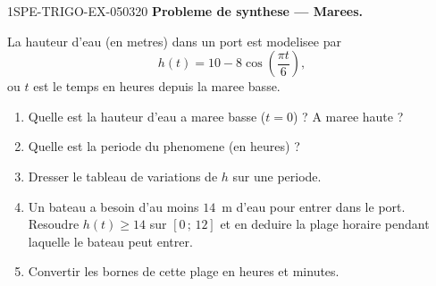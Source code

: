 \begin{exercice}{1SPE-TRIGO-EX-050}{3}{20}
\textbf{Probleme de synthese — Marees.}

La hauteur d'eau (en metres) dans un port est modelisee par
\[
  h(t) = 10 - 8\cos\!\left(\frac{\pi t}{6}\right),
\]
ou $t$ est le temps en heures depuis la maree basse.
\begin{enumerate}
  \item Quelle est la hauteur d'eau a maree basse ($t = 0$) ? A maree haute ?
  \item Quelle est la periode du phenomene (en heures) ?
  \item Dresser le tableau de variations de $h$ sur une periode.
  \item Un bateau a besoin d'au moins $14$~m d'eau pour entrer dans le port. Resoudre $h(t) \geqslant 14$ sur $[0\,;\,12]$ et en deduire la plage horaire pendant laquelle le bateau peut entrer.
  \item Convertir les bornes de cette plage en heures et minutes.
\end{enumerate}
\end{exercice}
